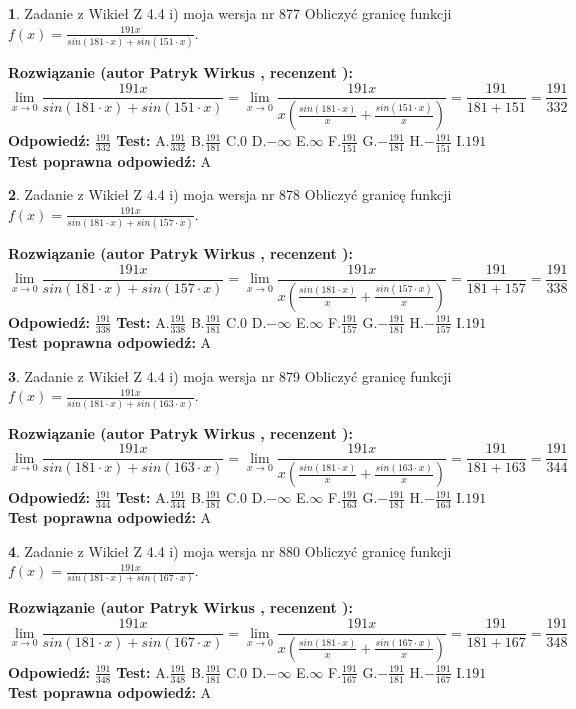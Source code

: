 \documentclass[12pt, a4paper]{article}
\theoremstyle{definition} %
\newtheorem{zad}{}
\newcommand{\zadStart}[1]{\begin{zad}#1\newline}
\newcommand{\zadStop}{\end{zad}}
\newcommand{\rozwStart}[2]{\noindent \textbf{Rozwiązanie (autor #1 , recenzent #2): }\newline}
\newcommand{\rozwStop}{\newline}
\newcommand{\odpStart}{\noindent \textbf{Odpowiedź:}\newline}
\newcommand{\odpStop}{\newline}
\newcommand{\testStart}{\noindent \textbf{Test:}\newline}
\newcommand{\testStop}{\newline}
\newcommand{\kluczStart}{\noindent \textbf{Test poprawna odpowiedź:}\newline}
\newcommand{\kluczStop}{\newline}
\begin{document}
\zadStart{Zadanie z Wikieł Z 4.4 i) moja wersja nr 877}
Obliczyć granicę funkcji $f(x)=\frac{191x}{sin(181\cdot x) +sin(151\cdot x)}$.
\zadStop
\rozwStart{Patryk Wirkus}{}
$$\lim\limits_{x\to 0}\frac{191x}{sin(181\cdot x) +sin(151\cdot x)}=\lim\limits_{x\to 0}\frac{191x}{x(\frac{sin(181\cdot x)}{x}+\frac{sin(151\cdot x)}{x})}=\frac{191}{181+151} = \frac{191}{332}$$
\rozwStop
\odpStart
$\frac{191}{332}$
\odpStop
\testStart
A.$\frac{191}{332}$
B.$\frac{191}{181}$
C.$0$
D.$-\infty$
E.$\infty$
F.$\frac{191}{151}$
G.$-\frac{191}{181}$
H.$-\frac{191}{151}$
I.$191$
\testStop
\kluczStart
A
\kluczStop



\zadStart{Zadanie z Wikieł Z 4.4 i) moja wersja nr 878}
Obliczyć granicę funkcji $f(x)=\frac{191x}{sin(181\cdot x) +sin(157\cdot x)}$.
\zadStop
\rozwStart{Patryk Wirkus}{}
$$\lim\limits_{x\to 0}\frac{191x}{sin(181\cdot x) +sin(157\cdot x)}=\lim\limits_{x\to 0}\frac{191x}{x(\frac{sin(181\cdot x)}{x}+\frac{sin(157\cdot x)}{x})}=\frac{191}{181+157} = \frac{191}{338}$$
\rozwStop
\odpStart
$\frac{191}{338}$
\odpStop
\testStart
A.$\frac{191}{338}$
B.$\frac{191}{181}$
C.$0$
D.$-\infty$
E.$\infty$
F.$\frac{191}{157}$
G.$-\frac{191}{181}$
H.$-\frac{191}{157}$
I.$191$
\testStop
\kluczStart
A
\kluczStop



\zadStart{Zadanie z Wikieł Z 4.4 i) moja wersja nr 879}
Obliczyć granicę funkcji $f(x)=\frac{191x}{sin(181\cdot x) +sin(163\cdot x)}$.
\zadStop
\rozwStart{Patryk Wirkus}{}
$$\lim\limits_{x\to 0}\frac{191x}{sin(181\cdot x) +sin(163\cdot x)}=\lim\limits_{x\to 0}\frac{191x}{x(\frac{sin(181\cdot x)}{x}+\frac{sin(163\cdot x)}{x})}=\frac{191}{181+163} = \frac{191}{344}$$
\rozwStop
\odpStart
$\frac{191}{344}$
\odpStop
\testStart
A.$\frac{191}{344}$
B.$\frac{191}{181}$
C.$0$
D.$-\infty$
E.$\infty$
F.$\frac{191}{163}$
G.$-\frac{191}{181}$
H.$-\frac{191}{163}$
I.$191$
\testStop
\kluczStart
A
\kluczStop



\zadStart{Zadanie z Wikieł Z 4.4 i) moja wersja nr 880}
Obliczyć granicę funkcji $f(x)=\frac{191x}{sin(181\cdot x) +sin(167\cdot x)}$.
\zadStop
\rozwStart{Patryk Wirkus}{}
$$\lim\limits_{x\to 0}\frac{191x}{sin(181\cdot x) +sin(167\cdot x)}=\lim\limits_{x\to 0}\frac{191x}{x(\frac{sin(181\cdot x)}{x}+\frac{sin(167\cdot x)}{x})}=\frac{191}{181+167} = \frac{191}{348}$$
\rozwStop
\odpStart
$\frac{191}{348}$
\odpStop
\testStart
A.$\frac{191}{348}$
B.$\frac{191}{181}$
C.$0$
D.$-\infty$
E.$\infty$
F.$\frac{191}{167}$
G.$-\frac{191}{181}$
H.$-\frac{191}{167}$
I.$191$
\testStop
\kluczStart
A
\kluczStop
\end{document}
